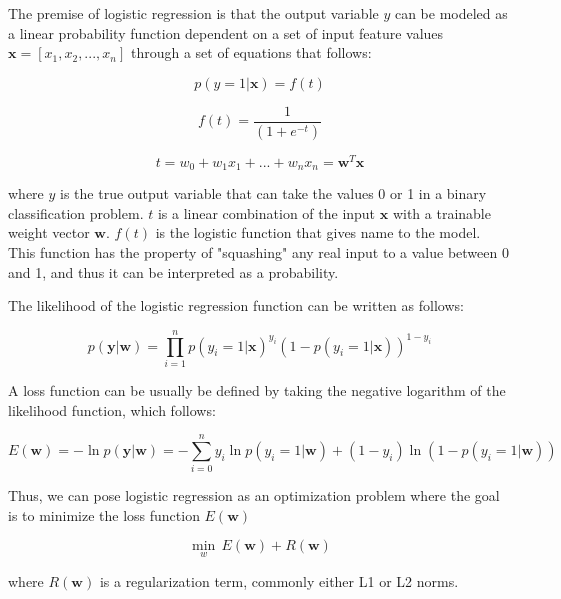 \documentclass{kththesis}
\begin{document}
The premise of logistic regression is that the output variable $y$ can be modeled as a linear probability function dependent on a set of input feature values  $\mathbf{x} = [x_1, x_2, ..., x_n]$ through a set of equations that follows:

\begin{equation}
p(y = 1|\mathbf{x}) = f(t)
\end{equation}

\begin{equation}
f(t) = \frac{1}{(1+e^{-t})}
\end{equation}

\begin{equation}
t = w_0 + w_1x_1 + ... + w_nx_n = \mathbf{w}^T\mathbf{x}
\end{equation}

where $y$ is the true output variable that can take the values 0 or 1 in a binary classification problem. $t$ is a linear combination of the input $\bm{x}$ with a trainable weight vector $\mathbf{w}$. $f(t)$ is the logistic function that gives name to the model. This function has the property of "squashing" any real input to a value between 0 and 1, and thus it can be interpreted as a probability.

The likelihood of the logistic regression function can be written as follows:

\begin{equation}
p(\mathbf{y}|\mathbf{w}) = \prod_{i=1}^{n}  p(y_i=1|\mathbf{x})^{y_i} (1-p(y_i=1|\mathbf{x}))^{1-y_i}
\end{equation}

A loss function can be usually be defined by taking the negative logarithm of the likelihood function, which follows:

\begin{equation}
E(\mathbf{w}) = -\ln p(\mathbf{y}|\mathbf{w}) = - \sum_{i=0}^{n} y_i \ln p(y_i=1|\mathbf{w}) + (1-y_i) \ln (1 - p(y_i=1|\mathbf{w}))
\end{equation}

Thus, we can pose logistic regression as an optimization problem where the goal is to minimize the loss function $E(\mathbf{w})$ 

\begin{equation}
\displaystyle{\min_w}\, E(\mathbf{w}) + R(\mathbf{w})
\end{equation}

where $R(\mathbf{w})$ is a regularization term, commonly either L1 or L2 norms.
\end{document}
